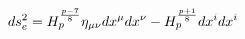 \begin{equation}
ds_{e}^{2}=H_{p}^{\frac{p-7}{8}}\eta _{\mu \nu}dx^{\mu }dx^{\nu }-H_{p}^{%
\frac{p+1}{8}}dx^{i}dx^{i}
\end{equation}

